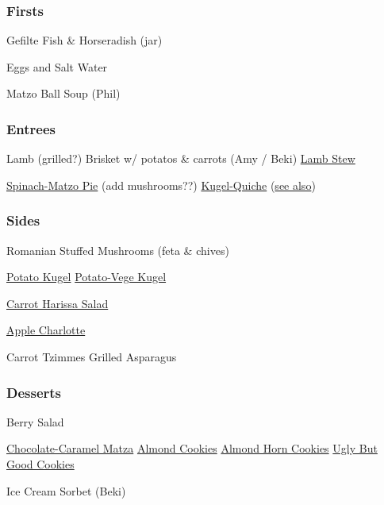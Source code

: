 \begin{centering}
 \subsubsection*{Firsts}
 Gefilte Fish \& Horseradish (jar)

 Eggs and Salt Water

 Matzo Ball Soup (Phil)

 \subsubsection*{Entrees}

 Lamb (grilled?) \blt Brisket w/ potatos \& carrots (Amy / Beki) \blt \href{https://instantpoteats.com/instant-pot-leg-lamb-stew-dates-cinnamon/}{Lamb Stew}

 \hyperref[Spinach Matzo Pie]{Spinach-Matzo Pie} (add mushrooms??) \blt \href{https://www.myjewishlearning.com/the-nosher/quiche-with-veggie-crust-recipe/}{Kugel-Quiche} (\href{https://toriavey.com/toris-kitchen/potato-crusted-spinach-frittata/}{see also})

 \subsubsection*{Sides}
 Romanian Stuffed Mushrooms (feta \& chives)

 \href{https://smittenkitchen.com/2015/12/potato-kugel/}{Potato Kugel} \blt \href{https://www.epicurious.com/recipes/food/views/potato-carrot-and-zucchini-kugel-241904}{Potato-Vege Kugel}

 \hyperref[Carrot Harissa Salad]{Carrot Harissa Salad}

 \hyperref[Apple Matzo Charlotte]{Apple Charlotte}

 Carrot Tzimmes \blt Grilled Asparagus

 \subsubsection*{Desserts}
 Berry Salad

 \href{https://smittenkitchen.com/2009/04/chocolate-caramel-crackers/}{Chocolate-Caramel Matza}
 \blt \href{https://smittenkitchen.com/2009/04/chewy-amaretti-cookies/}{Almond Cookies} \blt \href{https://smittenkitchen.com/2017/04/almond-horn-cookies/}{Almond Horn Cookies} \blt \href{https://smittenkitchen.com/2016/01/ugly-but-good-cookies/}{Ugly But Good Cookies}

 Ice Cream \blt Sorbet (Beki)

\end{centering}
